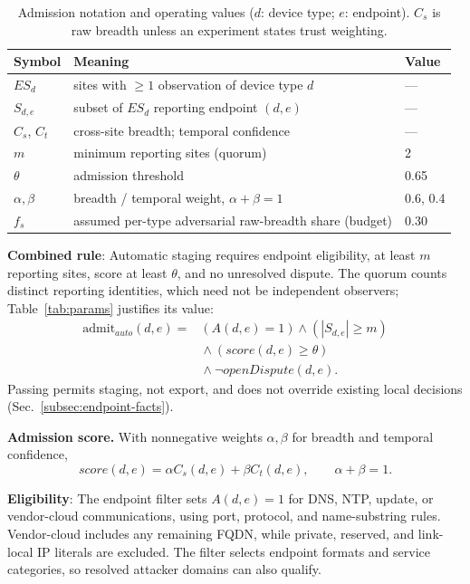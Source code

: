 \documentclass[journal]{IEEEtran}
\theoremstyle{definition}
\begin{document}
\begin{table}[t]
\centering
\caption{Admission notation and operating values ($d$: device type; $e$: endpoint). $C_s$ is raw breadth unless an experiment states trust weighting.}
\label{tab:symbols}
\scriptsize
\begin{tabular}{@{}p{1.3cm}p{5.00cm}p{0.75cm}@{}}
\toprule
Symbol & Meaning & Value \\
\midrule
$ES_d$ & sites with $\ge1$ observation of device type $d$ & --- \\
$S_{d,e}$ & subset of $ES_d$ reporting endpoint $(d,e)$ & --- \\
$C_s$, $C_t$ & cross-site breadth; temporal confidence & --- \\
$m$ & minimum reporting sites (quorum) & 2 \\
$\theta$ & admission threshold & 0.65 \\
$\alpha,\beta$ & breadth / temporal weight, $\alpha+\beta=1$ & 0.6, 0.4 \\
$f_s$ & assumed per-type adversarial raw-breadth share (budget) & 0.30 \\
\bottomrule
\end{tabular}
\end{table}

\textbf{Combined rule}: Automatic staging requires endpoint eligibility, at least $m$ reporting sites, score at least $\theta$, and no unresolved dispute. The quorum counts distinct reporting identities, which need not be independent observers; Table~\ref{tab:params} justifies its value:
\begin{equation}
\begin{aligned}
\mathrm{admit}_{auto}(d,e)
={}&(A(d,e)=1)\wedge(|S_{d,e}|\ge m)\\
 &{}\wedge(score(d,e)\ge\theta)\\
 &{}\wedge\neg openDispute(d,e).
\end{aligned}
\label{eq:admitauto}
\end{equation}
Passing permits staging, not export, and does not override existing local decisions (Sec.~\ref{subsec:endpoint-facts}).

\textbf{Admission score.} With nonnegative weights $\alpha,\beta$ for breadth and temporal confidence,
\begin{equation}
score(d,e)=\alpha C_s(d,e)+\beta C_t(d,e),
\qquad \alpha+\beta=1 .
\label{eq:score}
\end{equation}

\textbf{Eligibility}: The endpoint filter sets $A(d,e)=1$ for DNS, NTP, update, or vendor-cloud communications, using port, protocol, and name-substring rules. Vendor-cloud includes any remaining FQDN, while private, reserved, and link-local IP literals are excluded. The filter selects endpoint formats and service categories, so resolved attacker domains can also qualify.
\end{document}
